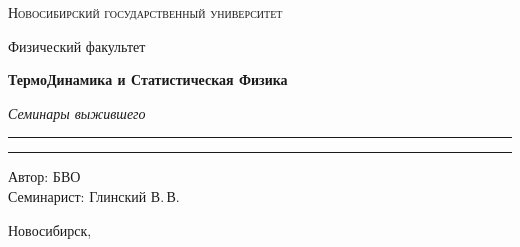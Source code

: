\documentclass[12pt,a4paper]{report}
\begin{document}
\begin{titlepage}
    \thispagestyle{empty}

    \begin{center}
        \vspace*{1.5cm}

        {\Large\scshape Новосибирский государственный университет\par}
        \vspace{0.25cm}
        {\large Физический факультет\par}

        \vfill

        {\Huge\bfseries ТермоДинамика и Статистическая Физика\par}

        \vspace{0.45cm}

        {\Large\itshape Семинары выжившего\par}

        \vspace{0.8cm}

        \rule{0.72\linewidth}{0 pt}



        \rule{2\linewidth}{0pt}

        \vfill

        \begin{flushright}
            \large
            Автор: БВО\\[0.25cm]
            Семинарист: Глинский В.\,В.
        \end{flushright}

        \vspace{1.2cm}

        {\large Новосибирск, \the\year}

    \end{center}
\end{titlepage}

\tableofcontents
\newpage



\clearpage
\end{document}
